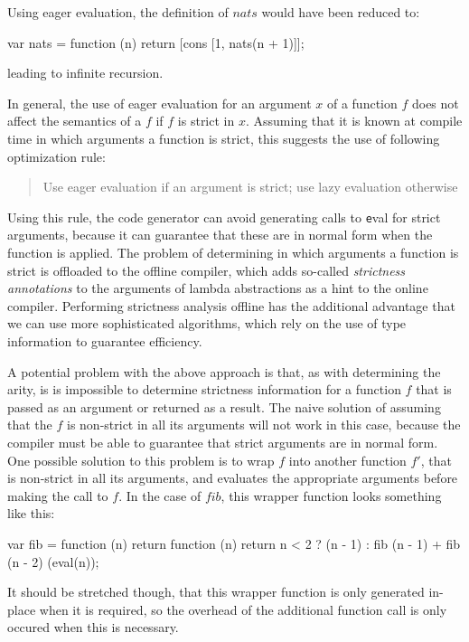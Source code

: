 Using eager evaluation, the definition of $nats$ would have been reduced to:

\begin{CleanCode}
var nats = function (n) {
    return [cons [1, nats(n + 1)]];
}
\end{CleanCode}

leading to infinite recursion.

In general, the use of eager evaluation for an argument $x$ of a function $f$
does not affect the semantics of a $f$ if $f$ is strict in $x$. Assuming that it
is known at compile time in which arguments a function is strict, this suggests
the use of following optimization rule:

\begin{quote}
Use eager evaluation if an argument is strict; use lazy evaluation otherwise
\end{quote}

Using this rule, the code generator can avoid generating calls to {\texttt eval}
for strict arguments, because it can guarantee that these are in normal form
when the function is applied. The problem of determining in which arguments a
function is strict is offloaded to the offline compiler, which adds so-called
{\em strictness annotations} to the arguments of lambda abstractions as a hint
to the online compiler. Performing strictness analysis offline has the
additional advantage that we can use more sophisticated algorithms, which rely
on the use of type information to guarantee efficiency.

A potential problem with the above approach is that, as with determining the
arity, is is impossible to determine strictness information for a function $f$
that is passed as an argument or returned as a result. The naive solution of
assuming that the $f$ is non-strict in all its arguments will not work in this
case, because the compiler must be able to guarantee that strict arguments are
in normal form. One possible solution to this problem is to wrap $f$ into
another function $f'$, that is non-strict in all its arguments, and evaluates
the appropriate arguments before making the call to $f$. In the case of $fib$,
this wrapper function looks something like this:

\begin{CleanCode}
var fib = function (n) {
    return function (n) {
        return n < 2 ? (n - 1) : fib (n - 1) + fib (n - 2)
    }(eval(n));
}
\end{CleanCode}

It should be stretched though, that this wrapper function is only generated
in-place when it is required, so the overhead of the additional function call
is only occured when this is necessary.

